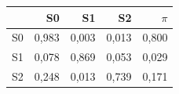 \begin{tabular}{lrrrr}
\toprule
 & S0 & S1 & S2 & $\pi$ \\
\midrule
S0 & 0,983 & 0,003 & 0,013 & 0,800 \\
S1 & 0,078 & 0,869 & 0,053 & 0,029 \\
S2 & 0,248 & 0,013 & 0,739 & 0,171 \\
\bottomrule
\end{tabular}